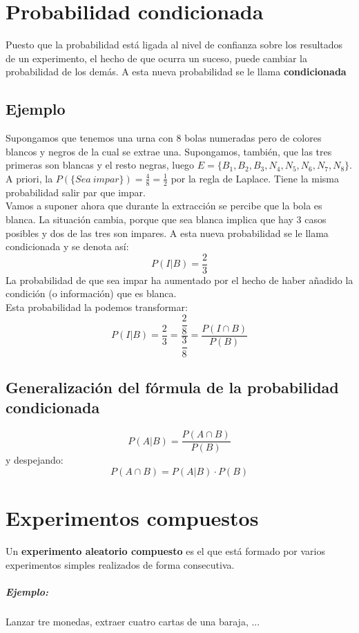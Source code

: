 \section{Probabilidad condicionada}

Puesto que la probabilidad está ligada al nivel de confianza sobre los resultados de un experimento, el hecho de que ocurra un suceso, puede cambiar la probabilidad de los demás. A esta nueva probabilidad se le llama \textbf{condicionada}
\subsection{Ejemplo}
 Supongamos que tenemos una urna con 8 bolas numeradas pero de colores blancos y negros de la cual se extrae una. Supongamos, también, que las tres primeras son blancas y el resto negras, luego  $E=\lbrace B_1,B_2, B_3, N_4, N_5, N_6, N_7, N_8\rbrace$.\\
 A priori, la $P(\lbrace Sea\ impar\rbrace )=\frac{4}{8}=\frac{1}{2}$ por la regla de Laplace. Tiene la misma probabilidad salir par que impar.\\
 
 Vamos a suponer ahora que durante la extracción se percibe que la bola es blanca. La situación cambia, porque que sea blanca implica que hay 3 casos posibles y dos de las tres son impares. A esta nueva probabilidad se le llama  condicionada y se denota así:
 $$P(I|B)=\dfrac{2}{3}$$
La probabilidad de que sea impar ha aumentado por el hecho de haber añadido la condición (o información) que es blanca.\\
Esta probabilidad la podemos transformar:
 $$P(I|B)=\dfrac{2}{3}=\dfrac{\dfrac{2}{8}}{\dfrac{3}{8}}=\dfrac{P(I\cap B)}{P(B)}$$

\subsection{Generalización del fórmula de la probabilidad condicionada} $$P(A|B)=\dfrac{P(A\cap B)}{P(B)}$$
y despejando:
$$P(A\cap B) = P(A|B)\cdot P(B)$$

\section{Experimentos compuestos} Un \textbf{experimento aleatorio compuesto} es el que está formado por varios experimentos simples realizados de forma consecutiva.
\subparagraph{Ejemplo:}Lanzar tre monedas, extraer cuatro cartas de una baraja, ...

